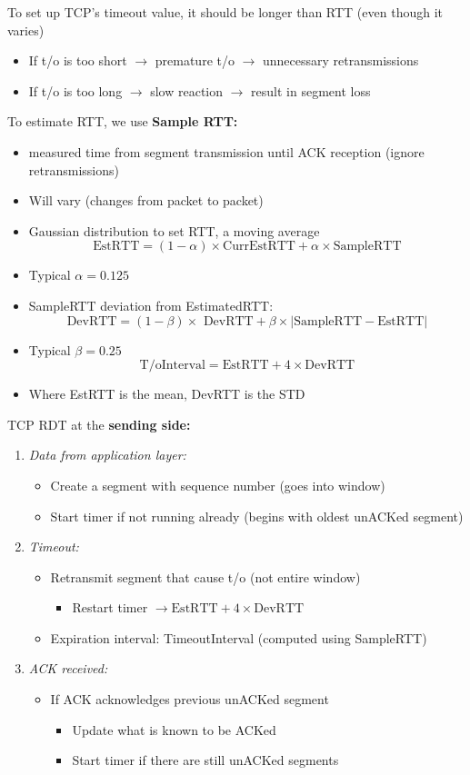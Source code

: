 \documentclass{article}
\begin{document}
To set up TCP's timeout value, it should be longer than RTT (even though it varies)
\begin{itemize}
    \item If t/o is too short $\rightarrow$ premature t/o $\rightarrow$ unnecessary retransmissions
    \item If t/o is too long $\rightarrow$ slow reaction $\rightarrow$ result in segment loss
\end{itemize}
To estimate RTT, we use \textbf{Sample RTT:} 
\begin{itemize}
    \item measured time from segment transmission until ACK reception (ignore retransmissions)
    \item Will vary (changes from packet to packet)
    \item Gaussian distribution to set RTT, a moving average 
    \[\text{EstRTT}=(1-\alpha)\times\text{CurrEstRTT}+\alpha\times\text{SampleRTT}\]
    \item Typical $\alpha=0.125$
    \item SampleRTT deviation from EstimatedRTT: 
    \[\text{DevRTT}=(1-\beta)\times\text{ DevRTT}+\beta\times|\text{SampleRTT}-\text{EstRTT}|\]
    \item Typical $\beta=0.25$ \[\text{T/oInterval}=\text{EstRTT}+4\times\text{DevRTT}\]
    \item Where EstRTT is the mean, DevRTT is the STD
\end{itemize}
TCP RDT at the \textbf{sending side:}
\begin{enumerate}
    \item \textit{Data from application layer:}
    \begin{itemize}
        \item Create a segment  with sequence number (goes into window)
        \item Start timer if not running already (begins with oldest unACKed segment)
    \end{itemize}
    \item \textit{Timeout:}
    \begin{itemize}
        \item Retransmit segment that cause t/o (not entire window)
        \begin{itemize}
            \item Restart timer $\rightarrow\text{EstRTT}+4\times\text{DevRTT}$
        \end{itemize}
        \item Expiration interval: TimeoutInterval (computed using SampleRTT)
    \end{itemize}
    \item \textit{ACK received:}
    \begin{itemize}
        \item If ACK acknowledges previous unACKed segment
        \begin{itemize}
            \item Update what is known to be ACKed
            \item Start timer if there are still unACKed segments
        \end{itemize}
    \end{itemize}
\end{enumerate}
\end{document}
